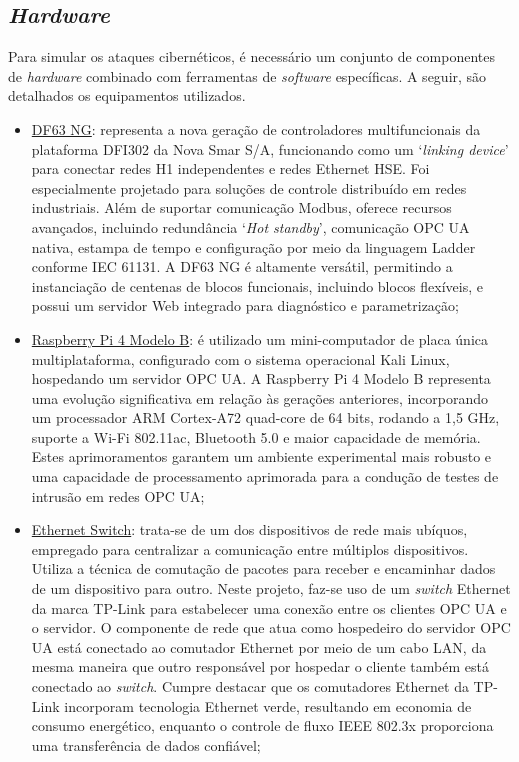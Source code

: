     \subsection{\textit{Hardware}}

        Para simular os ataques cibernéticos, é necessário um conjunto de componentes de \textit{hardware} combinado com ferramentas de \textit{software} específicas. A seguir, são detalhados os equipamentos utilizados.

        \begin{itemize}
            \item \underline{DF63 NG}: representa a nova geração de controladores multifuncionais da plataforma DFI302 da Nova Smar S/A, funcionando como um `\textit{linking device}' para conectar redes H1 independentes e redes Ethernet HSE. Foi especialmente projetado para soluções de controle distribuído em redes industriais. Além de suportar comunicação Modbus, oferece recursos avançados, incluindo redundância `\textit{Hot standby}', comunicação OPC UA nativa, estampa de tempo e configuração por meio da linguagem Ladder conforme IEC 61131. A DF63 NG é altamente versátil, permitindo a instanciação de centenas de blocos funcionais, incluindo blocos flexíveis, e possui um servidor Web integrado para diagnóstico e parametrização;
            \item \underline{Raspberry Pi 4 Modelo B}: é utilizado um mini-computador de placa única multiplataforma, configurado com o sistema operacional Kali Linux, hospedando um servidor OPC UA. A Raspberry Pi 4 Modelo B representa uma evolução significativa em relação às gerações anteriores, incorporando um processador ARM Cortex-A72 quad-core de 64 bits, rodando a 1,5 GHz, suporte a Wi-Fi 802.11ac, Bluetooth 5.0 e maior capacidade de memória. Estes aprimoramentos garantem um ambiente experimental mais robusto e uma capacidade de processamento aprimorada para a condução de testes de intrusão em redes OPC UA;
            \item \underline{Ethernet Switch}: trata-se de um dos dispositivos de rede mais ubíquos, empregado para centralizar a comunicação entre múltiplos dispositivos. Utiliza a técnica de comutação de pacotes para receber e encaminhar dados de um dispositivo para outro. Neste projeto, faz-se uso de um \textit{switch} Ethernet da marca TP-Link para estabelecer uma conexão entre os clientes OPC UA e o servidor. O componente de rede que atua como hospedeiro do servidor OPC UA está conectado ao comutador Ethernet por meio de um cabo LAN, da mesma maneira que outro responsável por hospedar o cliente também está conectado ao \textit{switch}. Cumpre destacar que os comutadores Ethernet da TP-Link incorporam tecnologia Ethernet verde, resultando em economia de consumo energético, enquanto o controle de fluxo IEEE 802.3x proporciona uma transferência de dados confiável;

\end{itemize}
